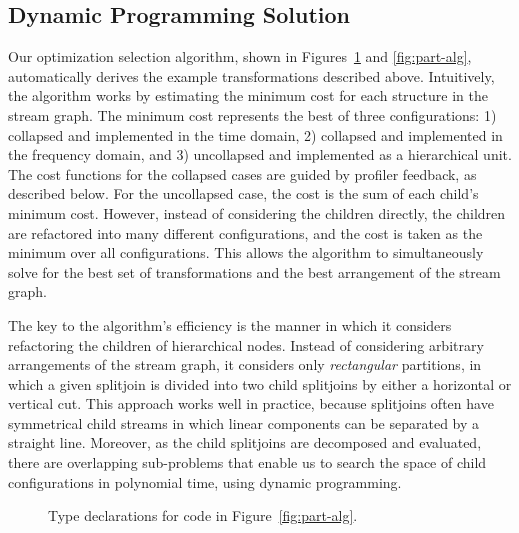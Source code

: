 \documentclass{sig-alternate}
\begin{document}
{\subsection{Dynamic Programming Solution}

Our optimization selection algorithm, shown in
Figures~\ref{fig:part-decl} and \ref{fig:part-alg}, automatically
derives the example transformations described above.  Intuitively, the
algorithm works by estimating the minimum cost for each structure in
the stream graph. The minimum cost represents the best of three
configurations: 1) collapsed and implemented in the time domain, 2)
collapsed and implemented in the frequency domain, and 3) uncollapsed
and implemented as a hierarchical unit.  The cost functions for the
collapsed cases are guided by profiler feedback, as described below.
For the uncollapsed case, the cost is the sum of each child's minimum
cost.  However, instead of considering the children directly, the
children are refactored into many different configurations, and the
cost is taken as the minimum over all configurations.  This allows the
algorithm to simultaneously solve for the best set of transformations
and the best arrangement of the stream graph.

The key to the algorithm's efficiency is the manner in which it
considers refactoring the children of hierarchical nodes.  Instead of
considering arbitrary arrangements of the stream graph, it considers
only {\it rectangular} partitions, in which a given splitjoin is
divided into two child splitjoins by either a horizontal 
or vertical cut.
This approach works well in practice, because splitjoins often have
symmetrical child streams in which linear components can be separated
by a straight line.  Moreover, as the child splitjoins are decomposed
and evaluated, there are overlapping sub-problems that enable us to
search the space of child configurations in polynomial time, using
dynamic programming.

\begin{figure}[t]
\vspace{-12pt}
  \vspace{-10pt}
  \caption{Type declarations for code in Figure~\ref{fig:part-alg}.
  \protect\label{fig:part-decl}}
  \vspace{-22pt}
  \makeline
  \vspace{-12pt}
\end{figure}

}
\end{document}
